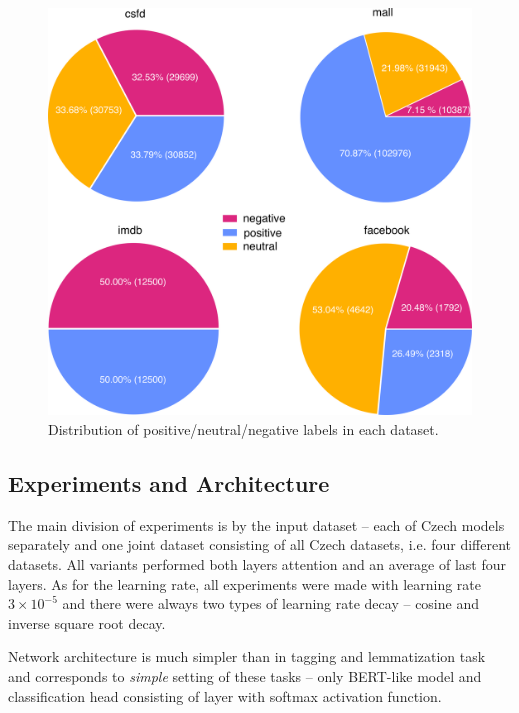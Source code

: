 \begin{figure}[!h]
\centering
\includegraphics[width=1\columnwidth]{../img/dist_all.png}
\protect\caption{Distribution of positive/neutral/negative labels in each dataset.}
\label{pic:dist}
\end{figure}



\subsection{Experiments and Architecture}
The main division of experiments is by the input dataset -- each of Czech models separately and one joint dataset consisting of all Czech datasets, i.e. four different datasets. All variants performed both layers attention and an average of last four layers. As for the learning rate, all experiments were made with learning rate $3 \times 10^{-5}$ and there were always two types of learning rate decay -- cosine and inverse square root decay. 
\par
Network architecture is much simpler than in tagging and lemmatization task and corresponds to \textit{simple} setting of these tasks -- only BERT-like model and classification head consisting of layer with softmax activation function. %

